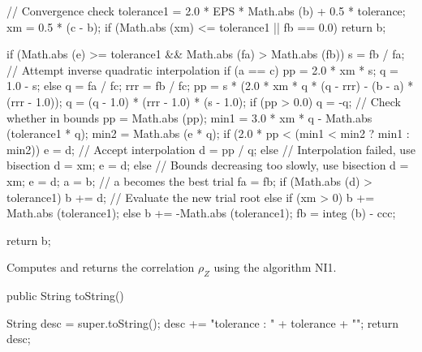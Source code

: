 \begin{code}
\begin{hide}
{{         // Convergence check
         tolerance1 = 2.0 * EPS * Math.abs (b) + 0.5 * tolerance;
         xm = 0.5 * (c - b);
         if (Math.abs (xm) <= tolerance1 || fb == 0.0)
            return b;

         if (Math.abs (e) >= tolerance1 && Math.abs (fa) > Math.abs (fb)) {
            s = fb / fa;   // Attempt inverse quadratic interpolation
            if (a == c) {
               pp = 2.0 * xm * s;
               q = 1.0 - s;
            } else {
               q = fa / fc;
               rrr = fb / fc;
               pp = s * (2.0 * xm * q * (q - rrr) - (b - a) * (rrr - 1.0));
               q = (q - 1.0) * (rrr - 1.0) * (s - 1.0);
            }
            if (pp > 0.0)
               q = -q;            // Check whether in bounds
            pp = Math.abs (pp);
            min1 = 3.0 * xm * q - Math.abs (tolerance1 * q);
            min2 = Math.abs (e * q);
            if (2.0 * pp < (min1 < min2 ? min1 : min2)) {
               e = d;             // Accept interpolation
               d = pp / q;
            } else {        // Interpolation failed, use bisection
               d = xm;
               e = d;
            }
         } else {     // Bounds decreasing too slowly, use bisection
            d = xm;
            e = d;
         }
         a = b;                   // a becomes the best trial
         fa = fb;
         if (Math.abs (d) > tolerance1)
            b += d;              // Evaluate the new trial root
         else {
            if (xm > 0)
               b += Math.abs (tolerance1);
            else
               b += -Math.abs (tolerance1);
         }
         fb = integ (b) - ccc;
      }

      return b;
   }\end{hide}
\end{code}
\begin{tabb} Computes and returns the correlation $\rho_Z$ using the algorithm NI1.
\end{tabb}
\begin{code}

   public String toString()\begin{hide}
   {
      String desc = super.toString();
      desc += "tolerance : " + tolerance + "\n";
      return desc;
   }\end{hide}
\end{code}

\begin{code}\begin{hide}
}\end{hide}
\end{code}
